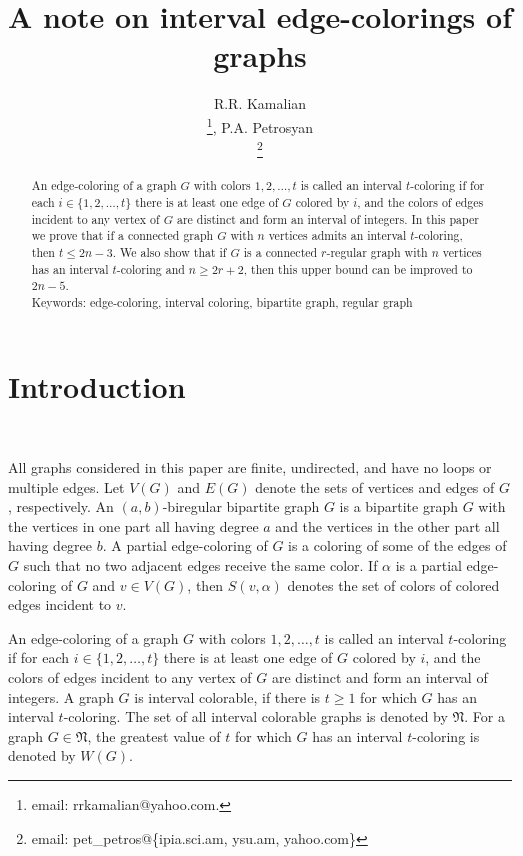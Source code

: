 \documentclass[fleqn,12pt,twoside]{article}
\title{A note on interval edge-colorings of graphs}
\author{R.R. Kamalian\address[MCSD]{Institute for Informatics and Automation Problems,\\
National Academy of Sciences, 0014, Armenia}\address{Department of Applied Mathematics and Informatics,\\
Russian-Armenian State University, 0051, Armenia}\thanks{email: rrkamalian@yahoo.com.},
        P.A. Petrosyan\addressmark[MCSD]\address{Department of Informatics and Applied Mathematics,\\
Yerevan State University, 0025, Armenia}\thanks {email: pet\_petros@\{ipia.sci.am, ysu.am, yahoo.com\}}}
\begin{document}
\maketitle

\begin{abstract}
An edge-coloring of a graph $G$ with colors $1,2,\ldots ,t$ is
called an interval $t$-coloring if for each $i\in \{1,2,\ldots,t\}$
there is at least one edge of $G$ colored by $i$, and the colors of
edges incident to any vertex of $G$ are distinct and form an
interval of integers. In this paper we prove that if a connected
graph $G$ with $n$ vertices admits an interval $t$-coloring, then
$t\leq 2n-3$. We also show that if $G$ is a connected $r$-regular
graph with $n$ vertices has an interval $t$-coloring and $n\geq
2r+2$, then this upper bound can be improved to $2n-5$.\\

Keywords: edge-coloring, interval coloring, bipartite graph, regular
graph

\end{abstract}

\bigskip

\section{Introduction}\

All graphs considered in this paper are finite, undirected, and have
no loops or multiple edges. Let $V(G)$ and $E(G)$ denote the sets of
vertices and edges of $G$, respectively. An $(a,b)$-biregular
bipartite graph $G$ is a bipartite graph $G$ with the vertices in
one part all having degree $a$ and the vertices in the other part
all having degree $b$. A partial edge-coloring of $G$ is a coloring
of some of the edges of $G$ such that no two adjacent edges receive
the same color. If $\alpha $ is a partial edge-coloring of $G$ and
$v\in V(G)$, then $S\left( v,\alpha \right)$ denotes the set of
colors of colored edges incident to $v$.

An edge-coloring of a graph $G$ with colors $1,2,\ldots ,t$ is
called an interval $t$-coloring if for each $i\in \{1,2,\ldots,t\}$
there is at least one edge of $G$ colored by $i$, and the colors of
edges incident to any vertex of $G$ are distinct and form an
interval of integers. A graph $G$ is interval colorable, if there is
$t\geq 1$ for which $G$ has an interval $t$-coloring. The set of all
interval colorable graphs is denoted by $\mathfrak{N}$. For a graph
$G\in \mathfrak{N}$, the greatest value of $t$ for which $G$ has an
interval $t$-coloring is denoted by $W\left(G\right)$.
\end{document}

